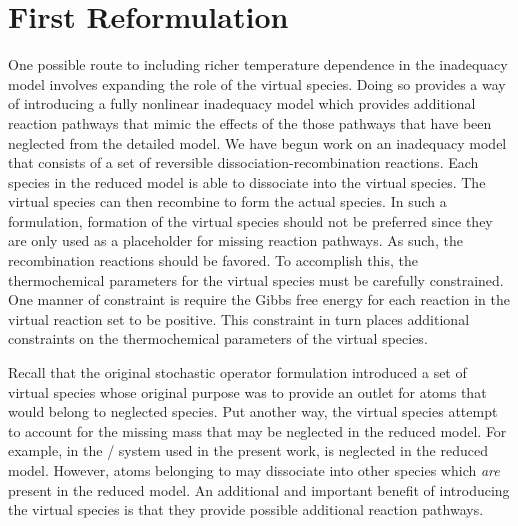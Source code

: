 \documentclass[fontsize=12pt, %
               paper=a4, %
               hyperref]{report}
\begin{document}
\section{First Reformulation}
  One possible route to including richer temperature dependence in the 
  inadequacy model involves expanding the role of the virtual species.  
  Doing so provides a way of introducing a fully nonlinear inadequacy model 
  which provides additional reaction pathways that mimic the effects of the 
  those pathways that have been neglected from the detailed model.  We have 
  begun work on an inadequacy model that consists of a set of reversible 
  dissociation-recombination reactions.  Each species in the reduced model 
  is able to dissociate into the virtual species.  The virtual species can 
  then recombine to form the actual species.  In such a formulation, 
  formation of the virtual species should not be preferred since they are 
  only used as a placeholder for missing reaction pathways.  As such, the 
  recombination reactions should be favored.  To accomplish this, the 
  thermochemical parameters for the virtual species must be carefully 
  constrained.  One manner of constraint is require the Gibbs free energy 
  for each reaction in the virtual reaction set to be positive.  This 
  constraint in turn places additional constraints on the thermochemical 
  parameters of the virtual species.

  Recall that the original stochastic operator formulation introduced a set 
  of virtual species whose original purpose was to provide an outlet for 
  atoms that would belong to neglected species.  Put another way, the virtual 
  species attempt to account for the missing mass that may be 
  neglected in the reduced model.  For example, in the / 
  system used in the present work,  is neglected in 
  the reduced model.  However, atoms belonging to  may 
  dissociate into other species which \textit{are} present in the 
  reduced model.  An additional and important benefit of introducing 
  the virtual species is that they provide possible additional reaction 
  pathways. 
\end{document}
